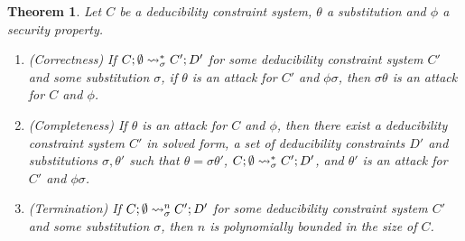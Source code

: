 \documentclass[acmtocl,acmnow]{acmtrans2m}
\newtheorem{theorem}{Theorem}[section]
\newcommand{\dedsys}[1]{deducibility constraint system}
\newcommand{\dedconss}[1]{deducibility constraints}
\begin{document}
\begin{theorem}\label{theo:general_NP}
Let $C$ be a \dedsys{}, $\theta$ a substitution and  $\phi$ a security property. \begin{enumerate}
\item(Correctness)
If $C;\emptyset\rightsquigarrow^*_{\sigma} C';D'$ for some \dedsys{}
$C'$
and some substitution $\sigma$, if $\theta$ is an attack  for $C'$ and $\phi\sigma$,
then $\sigma\theta$ is an attack for $C$ and $\phi$.\item(Completeness) If $\theta$ is an attack for  $C$ and $\phi$,
then there exist a \dedsys{} $C'$ in solved
  form, a set of \dedconss{} $D'$
  and  substitutions $\sigma,\theta'$ such that $\theta
  =\sigma\theta'$, $C;\emptyset\rightsquigarrow^*_{\sigma} C';D'$, and $\theta'$ is an
attack for  $C'$ and $\phi\sigma$.
\item(Termination) If $C;\emptyset\rightsquigarrow^n_{\sigma} C';D'$ for some
\dedsys{}
$C'$
and some substitution $\sigma$, then $n$ is polynomially bounded in
the size of $C$.
\end{enumerate}
\end{theorem}
\end{document}
